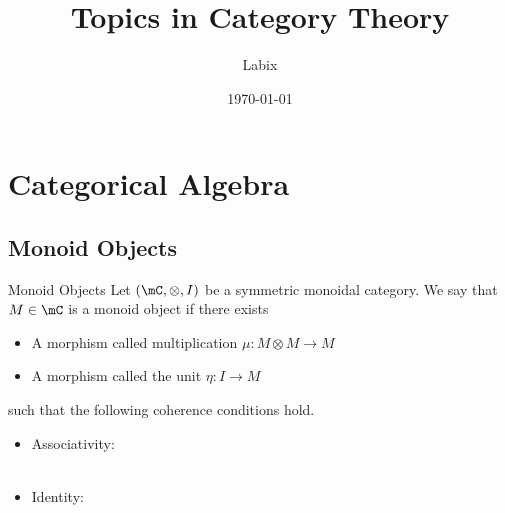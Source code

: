 \documentclass[a4paper]{article}
\title{Topics in Category Theory}
\author{Labix}
\date{\today}
\begin{document}
\maketitle
\begin{abstract}
\end{abstract}
\pagebreak
\tableofcontents

\pagebreak
\section{Categorical Algebra}
\subsection{Monoid Objects}
\begin{defn}{Monoid Objects}{} Let $(\mC,\otimes,I)$ be a symmetric monoidal category. We say that $M\in\mC$ is a monoid object if there exists
\begin{itemize}
\item A morphism called multiplication $\mu:M\otimes M\to M$
\item A morphism called the unit $\eta:I\to M$
\end{itemize}
such that the following coherence conditions hold. 
\begin{itemize}
\item Associativity: \\
\\
\item Identity: \\
\\
\end{itemize}
\end{defn}
\end{document}

